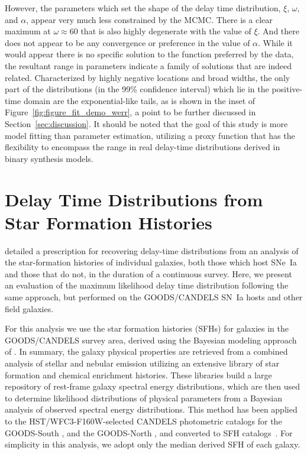 \documentclass[apj, twocolumn]{aastex62}
\begin{document}
However, the parameters which set the shape of the delay time distribution,  $\xi$, $\omega$, and $\alpha$, appear very much less constrained by the MCMC. There is a clear maximum at $\omega\approx60$ that is also highly degenerate with the value of $\xi$.  And there does not appear to be any convergence or preference in the value of $\alpha$. While it would appear there is no specific solution to the function preferred by the data, the resultant range in parameters indicate a family of solutions that are indeed related. Characterized by highly negative locations and broad widths, the only part of the distributions (in the 99\% confidence interval) which lie in the positive-time domain are the exponential-like tails, as is shown in the inset of Figure~\ref{fig:figure_fit_demo_werr}, a point to be further discussed in Section~\ref{sec:discussion}. {It should be noted that the goal of this study is more model fitting than parameter estimation, utilizing a proxy function that has the flexibility to encompass the range in real delay-time distributions derived in binary synthesis models.}


\section{Delay Time Distributions from Star Formation Histories}\label{sec:sfh}
\cite{Maoz:2011} detailed a prescription for recovering delay-time distributions from an analysis of the star-formation histories of individual galaxies, both those which host SNe~Ia and those that do not, in the duration of a continuous survey. Here, we present an evaluation of the maximum likelihood delay time distribution following the same approach, but performed on the GOODS/CANDELS SN~Ia hosts and other field galaxies. 

For this analysis we use the star formation histories (SFHs) for galaxies in the GOODS/CANDELS survey area, derived using the Bayesian modeling approach of \cite{Pacifici:2012ve}. In summary, the galaxy physical properties are retrieved from a combined analysis of stellar and nebular emission utilizing an extensive library of star formation and chemical enrichment histories. These libraries build a large repository of rest-frame galaxy spectral energy distributions, which are then used to determine likelihood distributions of physical parameters from a Bayesian analysis of observed spectral energy distributions. This method has been applied to the HST/WFC3-F160W-selected CANDELS photometric catalogs for the GOODS-South \citep{Guo:2013rp}, and the GOODS-North \citep{Barro:2019vn}, and converted to SFH catalogs~\cite[see][]{Pacifici:2016ul}. For simplicity in this analysis, we adopt only the median derived SFH of each galaxy.
\end{document}
